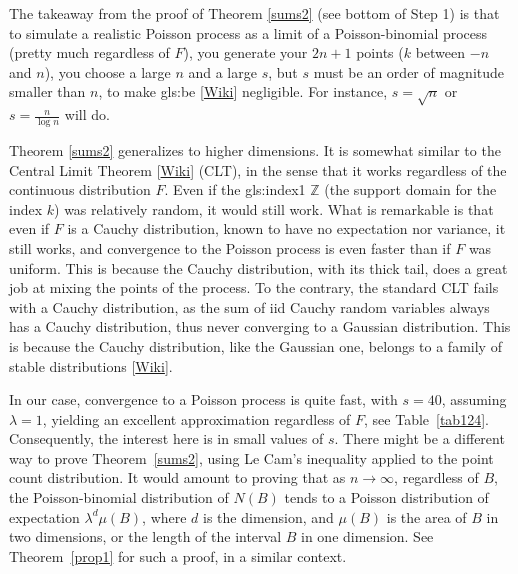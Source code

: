 \documentclass[10pt]{article}
\begin{document}
The takeaway from the proof of Theorem \ref{sums2} (see bottom of Step 1) is that to simulate a realistic Poisson process as a limit of a Poisson-binomial process (pretty much regardless of $F$), you generate your $2n+1$ points ($k$ between $-n$ and $n$), you choose a large $n$ and a large $s$, but $s$ must be an order of magnitude smaller than $n$, to make
\gls{gls:be} [\href{https://en.wikipedia.org/wiki/Boundary_problem_(spatial_analysis)}{Wiki}]  negligible. For instance, $s=\sqrt{n}$ or $s=\frac{n}{\log n}$ will do.

Theorem \ref{sums2} generalizes to higher dimensions. It is somewhat similar to
the \textcolor{index}{Central Limit Theorem} [\href{https://en.wikipedia.org/wiki/Central_limit_theorem}{Wiki}] (CLT),
in the sense that it works regardless of the continuous distribution $F$. Even if the
 \gls{gls:index1} $\mathbb{Z}$ (the support domain for the \textcolor{index}{index} $k$) was relatively random, it would still work. What is remarkable is that even if $F$ is a \textcolor{index}{Cauchy distribution}, known to have no expectation nor variance, it still works, and convergence to the Poisson process is even faster than if $F$ was uniform. This is because the Cauchy distribution, with its thick tail, does a great job at mixing the points of the process. To the contrary, the standard CLT fails with a Cauchy distribution, as the sum of iid Cauchy random variables always has a Cauchy distribution, thus never converging to a Gaussian distribution. This is because the Cauchy distribution, like the Gaussian one, belongs to a family of
\textcolor{index}{stable distributions} [\href{https://en.wikipedia.org/wiki/Stable_distribution}{Wiki}].

In our case, convergence to a Poisson process is quite fast, with $s=40$, assuming $\lambda=1$, yielding an excellent approximation regardless of $F$, see Table~\ref{tab124}. Consequently, the interest here is in small values of $s$. There might be a different way to prove Theorem~\ref{sums2}, using \textcolor{index}{Le Cam's inequality} \cite{lecam} applied to the point count distribution. It would amount to proving that as $n\rightarrow\infty$, regardless of $B$, the Poisson-binomial distribution of $N(B)$ tends to a Poisson distribution of expectation $\lambda^d\mu(B)$, where $d$ is the dimension, and $\mu(B)$ is the area of $B$ in two dimensions, or the length of the interval $B$ in one dimension. See Theorem~\ref{prop1} for such a proof, in a similar context.
\end{document}
